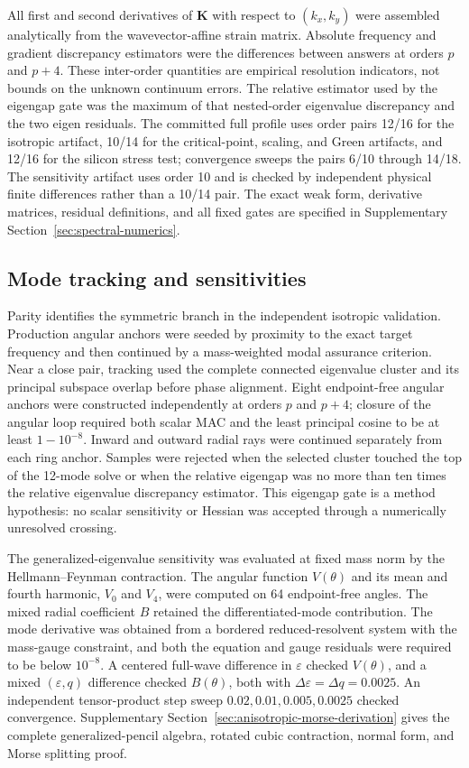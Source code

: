 All first and second derivatives of \(\boldsymbol K\) with respect to
\((k_x,k_y)\) were assembled analytically from the wavevector-affine strain
matrix.  Absolute frequency and gradient discrepancy estimators were the
differences between answers at orders \(p\) and \(p+4\).  These inter-order
quantities are empirical resolution indicators, not bounds on the unknown
continuum errors.  The relative estimator used by the eigengap gate was the
maximum of that nested-order eigenvalue discrepancy and the two eigen
residuals.  The committed full profile uses order
pairs 12/16 for the isotropic artifact, 10/14 for the critical-point, scaling,
and Green artifacts, and 12/16 for the silicon stress test; convergence sweeps
the pairs 6/10 through 14/18.  The sensitivity artifact uses order 10 and is
checked by independent physical finite differences rather than a 10/14 pair.  The exact
weak form, derivative matrices, residual definitions, and all fixed gates are
specified in Supplementary Section~\ref{sec:spectral-numerics}.

\subsection{Mode tracking and sensitivities}

Parity identifies the symmetric branch in the independent isotropic validation.
Production angular anchors were seeded by proximity to the exact target
frequency and then continued by a mass-weighted modal assurance criterion.  Near a close pair,
tracking used the complete connected eigenvalue cluster and its principal
subspace overlap before phase alignment.  Eight endpoint-free angular anchors
were constructed independently at orders \(p\) and \(p+4\); closure of the
angular loop required both scalar MAC and the least principal cosine to be at
least \(1-10^{-8}\).  Inward and outward radial rays were continued separately
from each ring anchor.  Samples were rejected when the selected cluster
touched the top of the 12-mode solve or when the relative eigengap was no more
than ten times the relative eigenvalue discrepancy estimator.  This eigengap
gate is a method hypothesis: no scalar sensitivity or Hessian was accepted
through a numerically unresolved crossing.

The generalized-eigenvalue sensitivity was evaluated at fixed mass norm by
the Hellmann--Feynman contraction.  The angular function \(V(\theta)\) and its
mean and fourth harmonic, \(V_0\) and \(V_4\), were computed on 64
endpoint-free angles.  The mixed radial coefficient \(B\) retained the
differentiated-mode contribution.  The mode derivative was obtained from a
bordered reduced-resolvent system with the mass-gauge constraint, and both the
equation and gauge residuals were required to be below \(10^{-8}\).  A centered
full-wave difference in \(\varepsilon\) checked \(V(\theta)\), and a mixed
\((\varepsilon,q)\) difference checked \(B(\theta)\), both with
\(\Delta\varepsilon=\Delta q=0.0025\).  An independent tensor-product step sweep
\(0.02,0.01,0.005,0.0025\) checked convergence.  Supplementary
Section~\ref{sec:anisotropic-morse-derivation} gives the complete
generalized-pencil algebra, rotated cubic contraction, normal form, and Morse
splitting proof.

